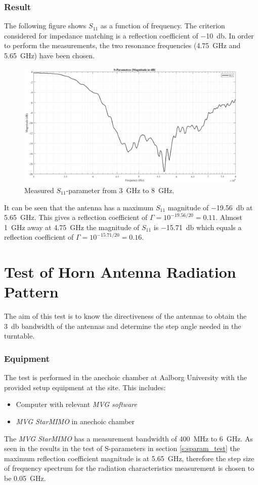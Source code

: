 \subsubsection{Result}
The following figure shows $S_{11}$ as a function of frequency. The criterion considered for impedance matching is a reflection coefficient of \SI{-10}{\decibel}. In order to perform the measurements, the two resonance frequencies (\SI{4.75}{\giga\hertz} and \SI{5.65}{\giga\hertz}) have been chosen.
\begin{figure}[H]
    \centering
    \includegraphics[width=1\textwidth]{figures/s11_meas.png}
    \caption{Measured $S_{11}$-parameter from \SI{3}{\giga\hertz} to \SI{8}{\giga\hertz}.} \label{fig:s11_meas}
\end{figure}
It can be seen that the antenna has a maximum $S_{11}$ magnitude of \SI{-19.56}{\decibel} at \SI{5.65}{\giga\hertz}. This gives a reflection coefficient of $\Gamma = 10^{-19.56/20} = 0.11$. Almost \SI{1}{\giga\hertz} away at \SI{4.75}{\giga\hertz} the magnitude of $S_{11}$ is \SI{-15.71}{\decibel} which equals a reflection coefficient of $\Gamma = 10^{-15.71/20} = 0.16$.

\section{Test of Horn Antenna Radiation Pattern} \label{s:rad_test}
The aim of this test is to know the directiveness of the antennas to obtain the \SI{3}{\decibel} bandwidth of the antennas and determine the step angle needed in the turntable.

\subsubsection{Equipment}
The test is performed in the anechoic chamber at Aalborg University with the provided setup equipment at the site. This includes:
\begin{itemize}
    \item Computer with relevant \textit{MVG software}
    \item \textit{MVG StarMIMO} in anechoic chamber
\end{itemize}
The \textit{MVG StarMIMO} has a measurement bandwidth of \SI{400}{\mega\hertz} to \SI{6}{\giga\hertz}. As seen in the results in the test of S-parameters in section \ref{s:sparam_test} the maximum reflection coefficient magnitude is at \SI{5.65}{\giga\hertz}, therefore the step size of frequency spectrum for the radiation characteristics measurement is chosen to be \SI{0.05}{\giga\hertz}.

